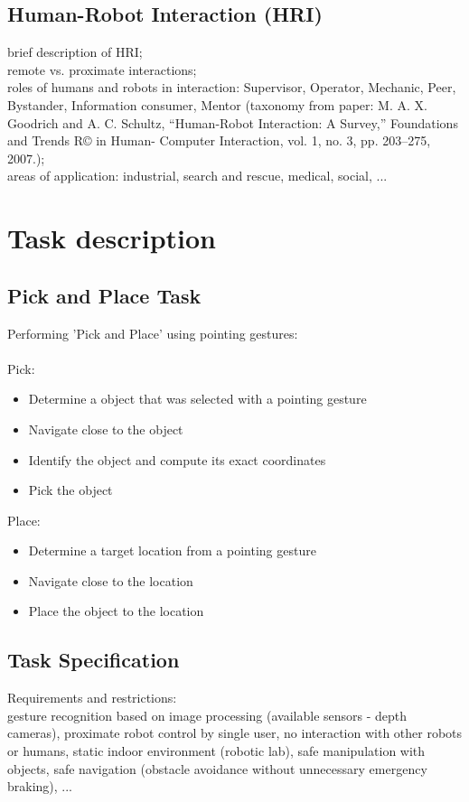 \subsection{Human-Robot Interaction (HRI)}
brief description of HRI; \\

remote vs. proximate interactions; \\

roles of humans and robots in interaction: Supervisor, Operator, Mechanic, Peer, Bystander, Information consumer, Mentor (taxonomy from paper: M. A. X. Goodrich and A. C. Schultz, “Human-Robot Interaction: A Survey,” Foundations and Trends R© in Human- Computer Interaction, vol. 1, no. 3, pp. 203–275, 2007.); \\

areas of application: industrial, search and rescue, medical, social, ...\\

\section{Task description}
\subsection{Pick and Place Task}

Performing 'Pick and Place' using pointing gestures:\\ \\
Pick:\\
\begin{itemize}
\item {Determine a object that was selected with a pointing gesture}
\item {Navigate close to the object}
\item {Identify the object and compute its exact coordinates}
\item {Pick the object}
\end{itemize}


Place:\\
\begin{itemize}
\item {Determine a target location from a pointing gesture}
\item {Navigate close to the location}
\item {Place the object to the location}
\end{itemize}

\subsection{Task Specification}
Requirements and restrictions:\\
gesture recognition based on image processing (available sensors - depth cameras), proximate robot control by single user, no interaction with other robots or humans, static indoor environment (robotic lab), safe manipulation with objects, safe navigation (obstacle avoidance without unnecessary emergency braking), ...

